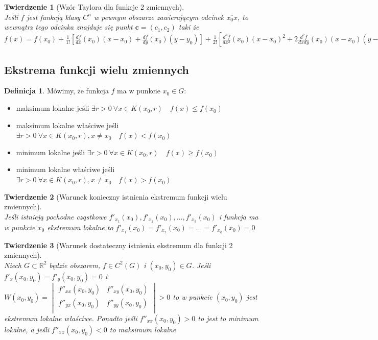 \documentclass[12pt,a4paper]{article}
\newtheorem{tw}{Twierdzenie}
\theoremstyle{definition}
\newtheorem{df}{Definicja}
\begin{document}
\begin{tw}[Wzór Taylora dla funkcje 2 zmiennych]~\\
Jeśli $f$ jest funkcją klasy $C^n$ w pewnym obszarze zawierającym odcinek $\overline{x_0x}$, to wewnątrz  tego odcinka znajduje się punkt $\mathbf{c} = (c_1,c_2)$ taki że\\
$
f(x) = f(x_0) + \frac{1}{1!}\left[\frac{df}{dx}(x_0)(x-x_0) + \frac{df}{dy}(x_0)(y-y_0)\right] +
				\frac{1}{2!}\left[\frac{d^2f}{dx^2}(x_0)(x-x_0)^2 + 2\frac{d^2f}{dxdy}(x_0)(x-x_0)(y-y_0) + \frac{d^2f}{dy^2}(x_0)(y-y_0)^2\right]
				+ \dots + \frac{1}{(n-1)!}\sum\limits_{i=0}^{n-1}{n \choose i}\frac{d^nf}{dx^idy^j}(x_0)(x-x_0)^i(y-y_0)^{n-i-1} + R_n(x_0) \text{, gdzie } R_n(x_0) = \frac{1}{n!}\sum\limits_{i=0}^n {n \choose i}\frac{d^n}{dx^idY^{n-1}}(c)(x-x_0)^i(y-y_0)^{n-1}
$
\end{tw}

\subsection{Ekstrema funkcji wielu zmiennych}
\begin{df}
Mówimy, że funkcja $f$ ma w punkcie $x_0\in G$:\\
\begin{itemize}
	\item maksimum lokalne jeśli $\exists r>0 ~\forall x\in K(x_0,r) \quad f(x) \leqslant f(x_0)$
	\item maksimum lokalne właściwe jeśli $\exists r>0 ~\forall x\in K(x_0,r), x \neq x_0  \quad f(x) < f(x_0)$
	\item minimum lokalne jeśli $\exists r>0 ~\forall x\in K(x_0,r) \quad f(x) \geqslant f(x_0)$
	\item minimum lokalne właściwe jeśli $\exists r>0 ~\forall x\in K(x_0,r), x \neq x_0  \quad f(x) > f(x_0)$
\end{itemize}
\end{df}

\begin{tw}[Warunek konieczny istnienia ekstremum funkcji wielu zmiennych]~\\
Jeśli istnieją pochodne cząstkowe $f'_{x_1}(x_0), f'_{x_2}(x_0), \dots, f'_{x_k}(x_0)$ i funkcja ma w punkcie $x_0$ ekstremum lokalne to $f'_{x_1}(x_0) = f'_{x_2}(x_0) = \dots = f'_{x_k}(x_0) = 0$
\end{tw}

\begin{tw}[Warunek dostateczny istnienia ekstremum dla funkcji 2 zmiennych]~\\
Niech $G\subset \mathbb{R}^2$ będzie obszarem, $f\in C^2(G)$ i $(x_0,y_0) \in G$. Jeśli $f'_x(x_0, y_0) = f'_y(x_0,y_0) = 0$ i $W(x_0,y_0) = 
\begin{vmatrix}
	f''_{xx}(x_0,y_0) & f''_{xy}(x_0,y_0)\\
	f''_{yx}(x_0,y_0) & f''_{yy}(x_0,y_0)\\
\end{vmatrix} > 0$ to w punkcie $(x_0,y_0)$ jest ekstremum lokalne właściwe. Ponadto jeśli $f''_{xx}(x_0,y_0)>0$ to jest to minimum lokalne, a jeśli $f''_{xx}(x_0,y_0)<0$ to maksimum lokalne
\end{tw}
\end{document}

